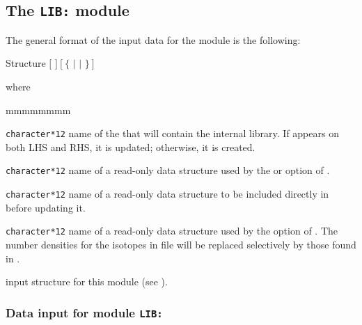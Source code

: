 \subsection{The {\tt LIB:} module}\label{sect:LIBData}

The general format of the input data for the  module is the following:

\vspace{-0.2cm}

\begin{DataStructure}{Structure }
 \moc{:=}  $[$  $]~[~\{$  $|$  $|$  $\}~]$ 
\moc{::} 
\end{DataStructure}

\vspace{-0.6cm}

\noindent
where

\begin{ListeDeDescription}{mmmmmmmm}

\item[\dusa{MICLIB}] {\tt character*12} name of the  that will contain the internal
library. If  appears on both LHS and RHS, it is updated; otherwise, it is created. 

\item[\dusa{MICRHS}] {\tt character*12} name of a read-only  data structure used by the
 or  option of .

\item[\dusa{MACRHS}] {\tt character*12} name of a read-only  data structure to be included
directly in  before updating it.

\item[\dusa{EVORHS}] {\tt character*12} name of a read-only  data structure used by the
 option of . The number densities for the isotopes in file 
will be replaced selectively by those found in .

\item[\dstr{desclib}] input structure for this module (see ).

\end{ListeDeDescription}

\subsubsection{Data input for module {\tt LIB:}}\label{sect:desclib}

